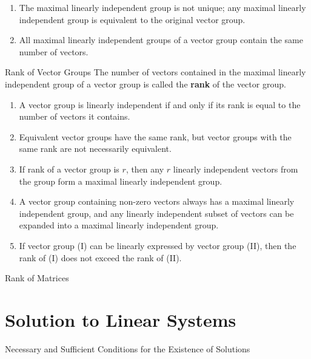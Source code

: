 \documentclass[11pt]{../../TexTemplate/elegantbook} %
\begin{document}
\begin{property}
    \begin{enumerate}
    \item The maximal linearly independent group is not unique; 
        any maximal linearly independent group is equivalent to the original vector group.
    \item All maximal linearly independent groups of a vector group contain the same number of vectors.
\end{enumerate}
\end{property}

\begin{definition}{Rank of Vector Groups}
    The number of vectors contained in the maximal linearly independent group of a vector group 
    is called the \textbf{rank} of the vector group.
\end{definition}

\begin{property}
    \begin{enumerate}
    \item A vector group is linearly independent if and only if its rank is equal to the number of vectors it contains.

    \item Equivalent vector groups have the same rank, but vector groups with the same rank are not necessarily equivalent.

    \item If rank of a vector group is \( r \), 
        then any \( r \) linearly independent vectors from the group form a maximal linearly independent group.

    \item A vector group containing non-zero vectors always has a maximal linearly independent group, 
        and any linearly independent subset of vectors can be expanded into a maximal linearly independent group.

    \item If vector group (I) can be linearly expressed by vector group (II), then the rank of (I) does not exceed the rank of (II).
\end{enumerate}
\end{property}




\begin{leftbarTitle}{Rank of Matrices}\end{leftbarTitle}

\section{Solution to Linear Systems}
\begin{leftbarTitle}{Necessary and Sufficient Conditions for the Existence of Solutions}\end{leftbarTitle}
\end{document}
